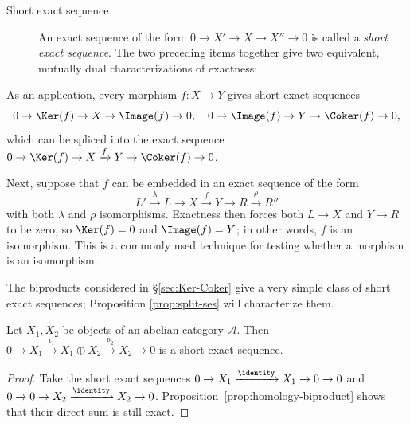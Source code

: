 \begin{description}
	\item[Short exact sequence] An exact sequence of the form
	$0\to X'\to X\to X''\to0$ is called a \emph{short exact sequence}. The two
	preceding items together give two equivalent, mutually dual
	characterizations of exactness:
\end{description}

As an application, every morphism $f:X\to Y$ gives short exact sequences
\[ 0 \to \Ker(f) \to X \to \Image(f) \to 0, \quad 0 \to \Image(f) \to Y \to \Coker(f) \to 0, \]
which can be spliced into the exact sequence
$0\to\Ker(f)\to X\xrightarrow{f}Y\to\Coker(f)\to0$.

Next, suppose that $f$ can be embedded in an exact sequence of the form
\[ L' \xrightarrow{\lambda} L \to X \xrightarrow{f} Y \to R \xrightarrow{\rho} R'' \]
with both $\lambda$ and $\rho$ isomorphisms. Exactness then forces both
$L\to X$ and $Y\to R$ to be zero, so $\Ker(f)=0$ and $\Image(f)=Y$; in other
words, $f$ is an isomorphism. This is a commonly used technique for testing
whether a morphism is an isomorphism.

The biproducts considered in \S\ref{sec:Ker-Coker} give a very simple class
of short exact sequences; Proposition \ref{prop:split-ses} will characterize
them.

\begin{proposition}\label{prop:biproduct-ses}
	Let $X_1,X_2$ be objects of an abelian category $\mathcal{A}$. Then
	$0\to X_1\xrightarrow{\iota_1}X_1\oplus X_2\xrightarrow{p_2}X_2\to0$
	is a short exact sequence.
\end{proposition}

\begin{proof}
	Take the short exact sequences
	$0\to X_1\xrightarrow{\identity}X_1\to0\to0$ and
	$0\to0\to X_2\xrightarrow{\identity}X_2\to0$.
	Proposition~\ref{prop:homology-biproduct} shows that their direct sum is
	still exact.
\end{proof}
